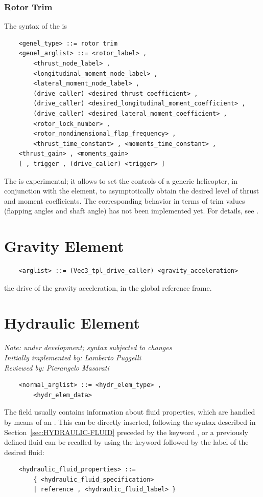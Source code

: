 \subsubsection{Rotor Trim}
\label{sec:EL:GENEL:ROTOR-TRIM}
The syntax of the  is
\begin{verbatim}
    <genel_type> ::= rotor trim
    <genel_arglist> ::= <rotor_label> ,
        <thrust_node_label> ,
        <longitudinal_moment_node_label> ,
        <lateral_moment_node_label> ,
        (drive_caller) <desired_thrust_coefficient> ,
        (drive_caller) <desired_longitudinal_moment_coefficient> ,
        (drive_caller) <desired_lateral_moment_coefficient> ,
        <rotor_lock_number> ,
        <rotor_nondimensional_flap_frequency> ,
        <thrust_time_constant> , <moments_time_constant> ,
	<thrust_gain> , <moments_gain>
	[ , trigger , (drive_caller) <trigger> ]
\end{verbatim}
The  is experimental; it allows to set the controls 
of a generic helicopter, in conjunction with the 
element, to asymptotically obtain the desired level of thrust and
moment coefficients.
The corresponding behavior in terms of trim values (flapping angles
and shaft angle) has not been implemented yet.
For details, see \cite{PETERS-TRIM90}.







\section{Gravity Element}
\begin{verbatim}
    <arglist> ::= (Vec3_tpl_drive_caller) <gravity_acceleration>
\end{verbatim}
the drive of the gravity acceleration, in the global reference frame.




\section{Hydraulic Element}
\label{sec:EL:HYDR}
{\em 
    Note: under development; syntax subjected to changes \\
    Initially implemented by: Lamberto Puggelli \\
    Reviewed by: Pierangelo Masarati
}
\begin{verbatim}
    <normal_arglist> ::= <hydr_elem_type> , 
        <hydr_elem_data>
\end{verbatim}
The field  usually contains information
about fluid properties, which are handled by means of an .
This can be directly inserted, following the syntax described in
Section~\ref{sec:HYDRAULIC-FLUID} preceded by the keyword , or a
previously defined fluid can be recalled by using the keyword 
 followed by the label of the desired fluid:
\begin{verbatim}
    <hydraulic_fluid_properties> ::=
        { <hydraulic_fluid_specification>
        | reference , <hydraulic_fluid_label> }
\end{verbatim}

